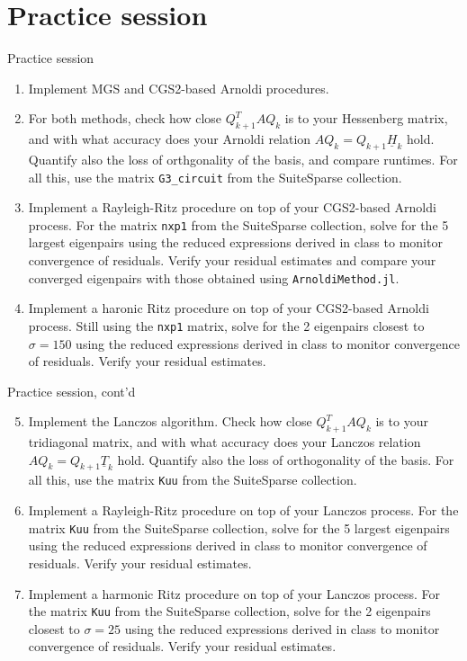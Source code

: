 \documentclass[t,usepdftitle=false]{beamer}
\begin{document}
\section{Practice session}
\begin{frame}[fragile]{Practice session}
\begin{enumerate}
\item Implement MGS and CGS2-based Arnoldi procedures.
\item For both methods, check how close $Q_{k+1}^TAQ_k$ is to your Hessenberg matrix, and with what accuracy does your Arnoldi relation $AQ_k=Q_{k+1}\underline{H}_k$ hold.
Quantify also the loss of orthgonality of the basis, and compare runtimes.
For all this, use the matrix \texttt{G3\_circuit} from the SuiteSparse collection.
\item Implement a Rayleigh-Ritz procedure on top of your CGS2-based Arnoldi process.
For the matrix \texttt{nxp1} from the SuiteSparse collection, solve for the 5 largest eigenpairs using the reduced expressions derived in class to monitor convergence of residuals.
Verify your residual estimates and compare your converged eigenpairs with those obtained using \texttt{ArnoldiMethod.jl}.
\item Implement a haronic Ritz procedure on top of your CGS2-based Arnoldi process.
Still using the \texttt{nxp1} matrix, solve for the 2 eigenpairs closest to $\sigma=150$ using the reduced expressions derived in class to monitor convergence of residuals.
Verify your residual estimates.
\end{enumerate}
\end{frame}

\begin{frame}[fragile]{Practice session, cont'd}
\begin{enumerate}
\setcounter{enumi}{4} 
\item Implement the Lanczos algorithm.
Check how close $Q_{k+1}^TAQ_k$ is to your tridiagonal matrix, and with what accuracy does your Lanczos relation $AQ_k=Q_{k+1}\underline{T}_k$ hold.
Quantify also the loss of orthogonality of the basis.
For all this, use the matrix \texttt{Kuu} from the SuiteSparse collection.
\item Implement a Rayleigh-Ritz procedure on top of your Lanczos process.
For the matrix \texttt{Kuu} from the SuiteSparse collection, solve for the 5 largest eigenpairs using the reduced expressions derived in class to monitor convergence of residuals.
Verify your residual estimates.
\item Implement a harmonic Ritz procedure on top of your Lanczos process.
For the matrix \texttt{Kuu} from the SuiteSparse collection, solve for the 2 eigenpairs closest to $\sigma=25$ using the reduced expressions derived in class to monitor convergence of residuals.
Verify your residual estimates.
\end{enumerate}
\end{frame}
\end{document}
